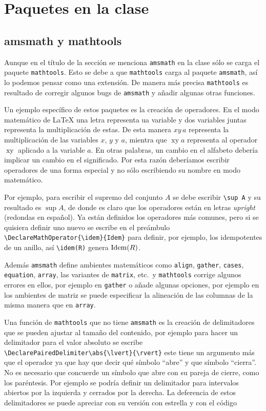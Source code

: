 
\chapter{Paquetes en la clase}

\section{amsmath y mathtools}
Aunque en el título de la sección se menciona \texttt{amsmath} en la clase
sólo se carga el paquete \texttt{mathtools}. Esto se debe a que
\texttt{mathtools} carga al paquete \texttt{amsmath}, así lo podemos pensar
como una extensión. De manera más precisa \texttt{mathtools} es resultado de
corregir algunos bugs de \texttt{amsmath} y añadir algunas otras funciones.

Un ejemplo específico de estos paquetes es la creación de operadores. En el
modo matemático de \LaTeX{} una letra representa ua variable y dos variables
juntas representa la multiplicación de estas. De esta manera \(xy\,a\)
representa la multiplicación de las variables \(x\), \(y\) y \(a\), mientra
que \(\operatorname{xy}a\) representa al operador \(\operatorname{xy}\)
aplicado a la variable \(a\). En otras palabras, un cambio en el alfabeto
debería implicar un cambio en el significado. Por esta razón deberíamos
escribir operadores de una forma especial y no sólo escribiendo su nombre en
modo matemático.

Por ejemplo, para escribir el supremo del conjunto \(A\) se debe escribir
\verb|\sup A| y su resultado es \(\sup A\), de donde es claro que los
operadores están en letras \textit{upright} (redondas en español). Ya están
definidos los operadores más comunes, pero si se quisiera definir uno nuevo
se escribe en el preámbulo \verb|\DeclareMathOperator{\idem}{Idem}| para
definir, por ejemplo, los idempotentes de un anillo, así \verb|\idem(R)|
genera \(\idem(R)\).

Además \texttt{amsmath} define ambientes matemáticos como
\texttt{align}, \texttt{gather}, \texttt{cases}, \texttt{equation},
\texttt{array}, las variantes de \texttt{matrix}, etc.\ y \texttt{mathtools}
corrige algunos errores en ellos, por ejemplo en \texttt{gather} o añade
algunas opciones, por ejemplo en los ambientes de matriz se puede
especificar la alineación de las columnas de la misma manera que en
\texttt{array}.

Una función de \texttt{mathtools} que no tiene \texttt{amsmath} es la creación de delimitadores que se pueden ajustar al tamaño del contenido, por ejemplo para hacer un delimitador para el valor absoluto se escribe
\verb|\DeclarePairedDelimiter\abs{\lvert}{\rvert}| este
tiene un argumento más que el operador ya que hay que decir qué símbolo
\enquote{abre} y que símbolo \enquote{cierra}. No es necesario que concuerde
un símbolo que abre con su pareja de cierre, como los paréntesis. Por
ejemplo se podría definir un delimitador para intervalos abiertos por la
izquierda y cerrados por la derecha. La deferencia de estos delimitadores se
puede apreciar con su versión con estrella y con el código

